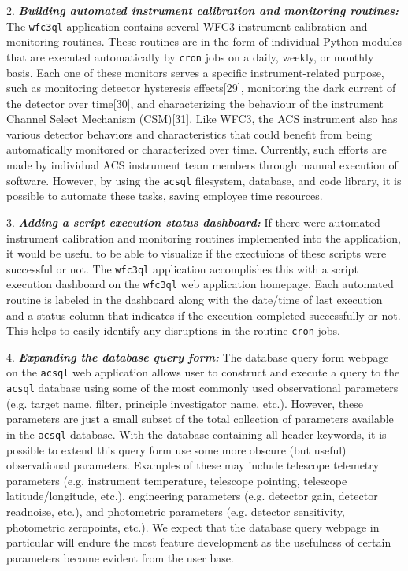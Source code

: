 \documentclass[10pt,journal,compsoc]{IEEEtran}
\begin{document}
2. \textbf{\textit{Building automated instrument calibration and monitoring routines:}}  The \texttt{wfc3ql} application contains several WFC3 instrument calibration and monitoring routines.  These
routines are in the form of individual Python modules that are executed automatically by \texttt{cron} jobs on a daily, weekly, or monthly basis.  Each one of these monitors serves a specific
instrument-related purpose, such as monitoring detector hysteresis effects[29], monitoring the dark current of the detector over time[30], and characterizing the behaviour of the instrument
Channel Select Mechanism (CSM)[31].  Like WFC3, the ACS instrument also has various detector behaviors and characteristics that could benefit from being automatically monitored or characterized
over time.  Currently, such efforts are made by individual ACS instrument team members through manual execution of software.  However, by using the \texttt{acsql} filesystem, database, and code library,
it is possible to automate these tasks, saving employee time resources.

3. \textbf{\textit{Adding a script execution status dashboard:}}  If there were automated instrument calibration and monitoring routines implemented into the application, it would be useful to
be able to visualize if the exectuions of these scripts were successful or not.  The \texttt{wfc3ql} application accomplishes this with a script execution dashboard on the \texttt{wfc3ql} web application
homepage.  Each automated routine is labeled in the dashboard along with the date/time of last execution and a status column that indicates if the execution completed successfully or not.  This helps to
easily identify any disruptions in the routine \texttt{cron} jobs.

4. \textbf{\textit{Expanding the database query form:}}  The database query form webpage on the \texttt{acsql} web application allows user to construct and execute a query to the \texttt{acsql} database
using some of the most commonly used observational parameters (e.g. target name, filter, principle investigator name, etc.).  However, these parameters are just a small subset of the total collection
of parameters available in the \texttt{acsql} database.  With the database containing all header keywords, it is possible to extend this query form use some more obscure (but useful) observational parameters.
Examples of these may include telescope telemetry parameters (e.g. instrument temperature, telescope pointing, telescope latitude/longitude, etc.), engineering parameters (e.g. detector gain, detector
readnoise, etc.), and photometric parameters (e.g. detector sensitivity, photometric zeropoints, etc.).  We expect that the database query webpage in particular will endure the most feature development
as the usefulness of certain parameters become evident from the user base.
\end{document}
